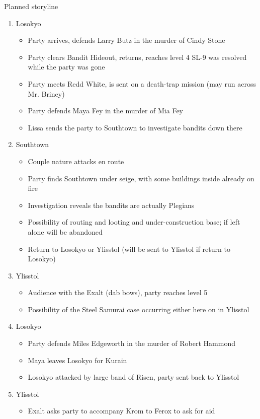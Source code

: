 \documentclass[11pt]{article} %
\begin{document}
Planned storyline
\begin{enumerate}
\item Losokyo
\begin{itemize}
\item Party arrives, defends Larry Butz in the murder of Cindy Stone
\item Party clears Bandit Hideout, returns, reaches level 4
SL-9 was resolved while the party was gone
\item Party meets Redd White, is sent on a death-trap mission (may run across Mr. Briney)
\item Party defends Maya Fey in the murder of Mia Fey
\item Lissa sends the party to Southtown to investigate bandits down there
\end{itemize}
\item Southtown
\begin{itemize}
\item Couple nature attacks en route
\item Party finds Southtown under seige, with some buildings inside already on fire
\item Investigation reveals the bandits are actually Plegians
\item Possibility of routing and looting and under-construction base; if left alone will be abandoned
\item Return to Losokyo or Ylisstol (will be sent to Ylisstol if return to Losokyo)
\end{itemize}
\item Ylisstol
\begin{itemize}
\item Audience with the Exalt (dab bows), party reaches level 5
\item Possibility of the Steel Samurai case occurring either here on in Ylisstol
\end{itemize}
\item Losokyo
\begin{itemize}
\item Party defends Miles Edgeworth in the murder of Robert Hammond
\item Maya leaves Losokyo for Kurain
\item Losokyo attacked by large band of Risen, party sent back to Ylisstol
\end{itemize}
\item Ylisstol
\begin{itemize}
\item Exalt asks party to accompany Krom to Ferox to ask for aid

\end{itemize}
\end{enumerate}
\end{document}
